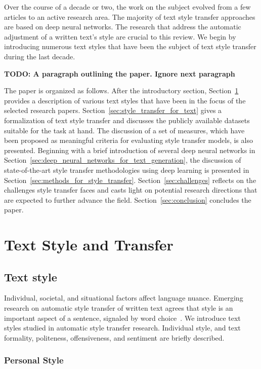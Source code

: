 \documentclass[akbc,twoside,11pt]{article}
\begin{document}
Over the course of a decade or two, the work on the subject evolved from a few articles to an active research area. The majority of text style transfer approaches are based on deep neural networks. The research that address the automatic adjustment of a written text's style are crucial to this review. We begin by introducing numerous text styles that have been the subject of text style transfer during the last decade.

\textbf{TODO: A paragraph outlining the paper. Ignore next paragraph}

The paper is organized as follows. After the introductory section, Section~\ref{sec:textual_style} provides a description of various text styles that have been in the focus of the selected research papers. Section~\ref{sec:style_transfer_for_text} gives a formalization of text style transfer and discusses the publicly available datasets suitable for the task at hand. The discussion of a set of measures, which have been proposed as meaningful criteria for evaluating style transfer models, is also presented. Beginning with a brief introduction of several deep neural networks in Section~\ref{sec:deep_neural_networks_for_text_generation}, the discussion of state-of-the-art style transfer methodologies using deep learning is presented in Section~\ref{sec:methods_for_style_transfer}. Section~\ref{sec:challenges} reflects on the challenges style transfer faces and casts light on potential research directions that are expected to further advance the field. Section~\ref{sec:conclusion} concludes the paper.

\section{Text Style and Transfer}
\label{sec:textual_style}

\subsection{Text style}

Individual, societal, and situational factors affect language nuance. Emerging research on automatic style transfer of written text agrees that style is an important aspect of a sentence, signaled by word choice~\cite{argamon2010rest}. We introduce text styles studied in automatic style transfer research. Individual style, and text formality, politeness, offensiveness, and sentiment are briefly described. 

\subsubsection{Personal Style}
\end{document}
